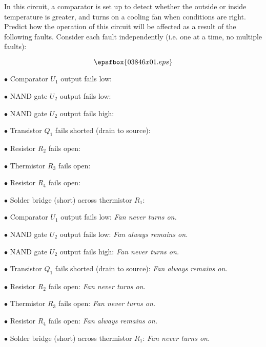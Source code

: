 

In this circuit, a comparator is set up to detect whether the outside or inside temperature is greater, and turns on a cooling fan when conditions are right.  Predict how the operation of this circuit will be affected as a result of the following faults.  Consider each fault independently (i.e. one at a time, no multiple faults):

$$\epsfbox{03846x01.eps}$$

\medskip
\item{$\bullet$} Comparator $U_1$ output fails low:
\item{$\bullet$} NAND gate $U_2$ output fails low:
\item{$\bullet$} NAND gate $U_2$ output fails high:
\item{$\bullet$} Transistor $Q_1$ fails shorted (drain to source):
\item{$\bullet$} Resistor $R_2$ fails open:
\item{$\bullet$} Thermistor $R_3$ fails open:
\item{$\bullet$} Resistor $R_4$ fails open:
\item{$\bullet$} Solder bridge (short) across thermistor $R_1$:
\medskip







\medskip
\item{$\bullet$} Comparator $U_1$ output fails low: {\it Fan never turns on.}
\item{$\bullet$} NAND gate $U_2$ output fails low: {\it Fan always remains on.}
\item{$\bullet$} NAND gate $U_2$ output fails high: {\it Fan never turns on.}
\item{$\bullet$} Transistor $Q_1$ fails shorted (drain to source): {\it Fan always remains on.}
\item{$\bullet$} Resistor $R_2$ fails open: {\it Fan never turns on.}
\item{$\bullet$} Thermistor $R_3$ fails open: {\it Fan never turns on.}
\item{$\bullet$} Resistor $R_4$ fails open: {\it Fan always remains on.}
\item{$\bullet$} Solder bridge (short) across thermistor $R_1$: {\it Fan never turns on.}
\medskip

